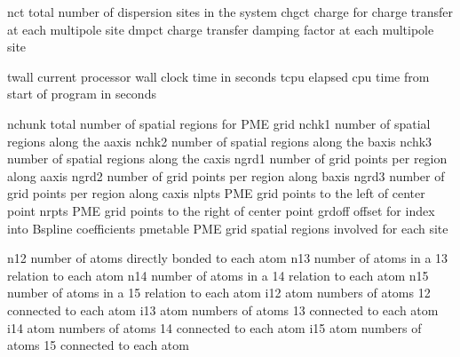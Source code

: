 \documentclass[letterpaper,11pt,english]{sphinxmanual}
\begin{document}

\begin{sphinxVerbatim}[commandchars=\\\{\}]
nct             total number of dispersion sites in the system
chgct           charge for charge transfer at each multipole site
dmpct           charge transfer damping factor at each multipole site
\end{sphinxVerbatim}


\begin{sphinxVerbatim}[commandchars=\\\{\}]
twall           current processor wall clock time in seconds
tcpu            elapsed cpu time from start of program in seconds
\end{sphinxVerbatim}


\begin{sphinxVerbatim}[commandchars=\\\{\}]
nchunk          total number of spatial regions for PME grid
nchk1           number of spatial regions along the a\PYGZhy{}axis
nchk2           number of spatial regions along the b\PYGZhy{}axis
nchk3           number of spatial regions along the c\PYGZhy{}axis
ngrd1           number of grid points per region along a\PYGZhy{}axis
ngrd2           number of grid points per region along b\PYGZhy{}axis
ngrd3           number of grid points per region along c\PYGZhy{}axis
nlpts           PME grid points to the left of center point
nrpts           PME grid points to the right of center point
grdoff          offset for index into B\PYGZhy{}spline coefficients
pmetable        PME grid spatial regions involved for each site
\end{sphinxVerbatim}


\begin{sphinxVerbatim}[commandchars=\\\{\}]
n12             number of atoms directly bonded to each atom
n13             number of atoms in a 1\PYGZhy{}3 relation to each atom
n14             number of atoms in a 1\PYGZhy{}4 relation to each atom
n15             number of atoms in a 1\PYGZhy{}5 relation to each atom
i12             atom numbers of atoms 1\PYGZhy{}2 connected to each atom
i13             atom numbers of atoms 1\PYGZhy{}3 connected to each atom
i14             atom numbers of atoms 1\PYGZhy{}4 connected to each atom
i15             atom numbers of atoms 1\PYGZhy{}5 connected to each atom
\end{sphinxVerbatim}
\end{document}
